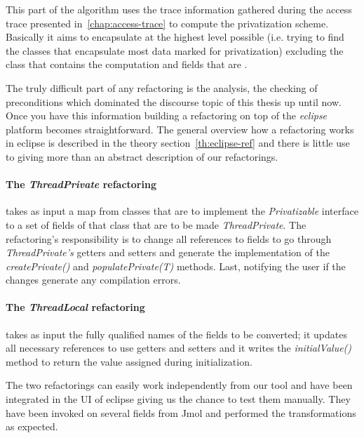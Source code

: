 This part of the algorithm uses the trace information gathered during the access
trace presented in~\ref{chap:access-trace} to compute the privatization scheme.
Basically it aims to encapsulate at the highest level possible (i.e. trying to
find the classes that encapsulate most data marked for privatization) excluding
the class that contains the computation and fields that are \lcds.

The truly difficult part of any refactoring is the analysis, the checking of
preconditions which dominated the discourse topic of this thesis up until now.
Once you have this information building a refactoring on top of the
\emph{eclipse} platform becomes straightforward. The general overview how a
refactoring works in eclipse is described in the theory
section~\ref{th:eclipse-ref} and there is little use to giving more than an
abstract description of our refactorings.

\paragraph{The \emph{ThreadPrivate} refactoring} takes as input a map from
classes that are to implement the \emph{Privatizable} interface to a set of fields of that class that are to be
made \emph{ThreadPrivate}. The refactoring's responsibility is to change all
references to fields to go through \emph{ThreadPrivate's} getters and setters
and generate the implementation of the \emph{createPrivate()} and
\emph{populatePrivate(T)} methods. Last, notifying the user if the changes
generate any compilation errors.

\paragraph{The \emph{ThreadLocal} refactoring} takes as input the fully
qualified names of the fields to be converted; it updates all necessary references to use getters
and setters and it writes the \emph{initialValue()} method to return the value
assigned during initialization.

The two refactorings can easily work independently from our tool and have been
integrated in the UI of eclipse giving us the chance to test them manually. They
have been invoked on several fields from Jmol and performed the transformations
as expected.



